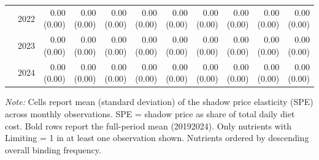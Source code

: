 \begin{table}[htbp]
\begin{tabular}{llrrrrrrrrr}
 & 2022 & 0.00 (0.00) & 0.00 (0.00) & 0.00 (0.00) & 0.00 (0.00) & 0.00 (0.00) & 0.00 (0.00) & 0.00 (0.00) & 0.00 (0.00) & 0.00 (0.00) \\
 & 2023 & 0.00 (0.00) & 0.00 (0.00) & 0.00 (0.00) & 0.00 (0.00) & 0.00 (0.00) & 0.00 (0.00) & 0.00 (0.00) & 0.00 (0.00) & 0.00 (0.00) \\
 & 2024 & 0.00 (0.00) & 0.00 (0.00) & 0.00 (0.00) & 0.00 (0.00) & 0.00 (0.00) & 0.00 (0.00) & 0.00 (0.00) & 0.00 (0.00) & 0.00 (0.00) \\
\bottomrule
\end{tabular}
\begin{minipage}{\linewidth}
\vspace{2pt}\footnotesize
\textit{Note:} Cells report mean (standard deviation) of the shadow price elasticity (SPE) across monthly observations. SPE = shadow price as share of total daily diet cost. Bold rows report the full-period mean (2019\textendash{}2024). Only nutrients with Limiting = 1 in at least one observation shown. Nutrients ordered by descending overall binding frequency.
\end{minipage}
\end{table}
